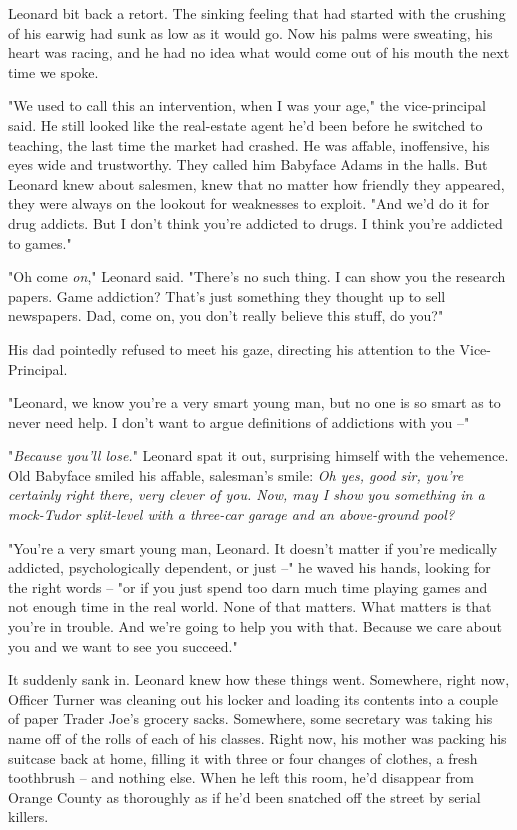 Leonard bit back a retort. The sinking feeling that had started
with the crushing of his earwig had sunk as low as it would go. Now
his palms were sweating, his heart was racing, and he had no idea
what would come out of his mouth the next time we spoke.

"We used to call this an intervention, when I was your age," the
vice-principal said. He still looked like the real-estate agent
he'd been before he switched to teaching, the last time the market
had crashed. He was affable, inoffensive, his eyes wide and
trustworthy. They called him Babyface Adams in the halls. But
Leonard knew about salesmen, knew that no matter how friendly they
appeared, they were always on the lookout for weaknesses to
exploit. "And we'd do it for drug addicts. But I don't think you're
addicted to drugs. I think you're addicted to games."

"Oh come \emph{on}," Leonard said. "There's no such thing. I can
show you the research papers. Game addiction? That's just something
they thought up to sell newspapers. Dad, come on, you don't really
believe this stuff, do you?"

His dad pointedly refused to meet his gaze, directing his attention
to the Vice-Principal.

"Leonard, we know you're a very smart young man, but no one is so
smart as to never need help. I don't want to argue definitions of
addictions with you --"

"\emph{Because you'll lose.}" Leonard spat it out, surprising
himself with the vehemence. Old Babyface smiled his affable,
salesman's smile:
\emph{Oh yes, good sir, you're certainly right there, very clever of you. Now, may I show you something in a mock-Tudor split-level with a three-car garage and an above-ground pool?}

"You're a very smart young man, Leonard. It doesn't matter if
you're medically addicted, psychologically dependent, or just --"
he waved his hands, looking for the right words -- "or if you just
spend too darn much time playing games and not enough time in the
real world. None of that matters. What matters is that you're in
trouble. And we're going to help you with that. Because we care
about you and we want to see you succeed."

It suddenly sank in. Leonard knew how these things went. Somewhere,
right now, Officer Turner was cleaning out his locker and loading
its contents into a couple of paper Trader Joe's grocery sacks.
Somewhere, some secretary was taking his name off of the rolls of
each of his classes. Right now, his mother was packing his suitcase
back at home, filling it with three or four changes of clothes, a
fresh toothbrush -- and nothing else. When he left this room, he'd
disappear from Orange County as thoroughly as if he'd been snatched
off the street by serial killers.

